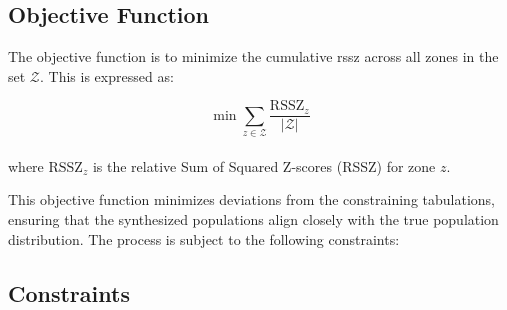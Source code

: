 \subsection*{Objective Function}
The objective function is to minimize the cumulative \gls{rssz} across all zones in the set \( \mathcal{Z} \). This is expressed as:

\[
\min \sum_{z \in \mathcal{Z}} \frac{\text{RSSZ}_z}{| \mathcal{Z} |}
\]
\\
where \( \text{RSSZ}_z \) is the relative Sum of Squared Z-scores (RSSZ) for zone \( z \).

This objective function minimizes deviations from the constraining tabulations, ensuring that the synthesized populations align closely with the true population distribution. The process is subject to the following constraints:

\subsection*{Constraints}

